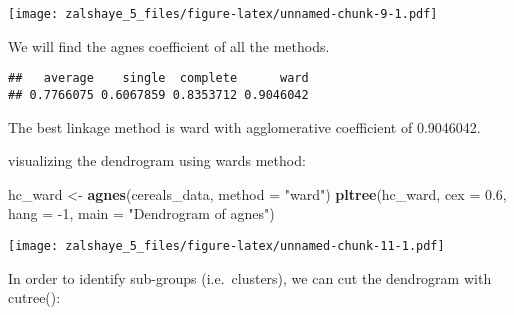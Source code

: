 \documentclass[
]{article}
\newenvironment{Shaded}{\begin{snugshade}}{\end{snugshade}}
\newcommand{\CommentTok}[1]{\textcolor[rgb]{0.56,0.35,0.01}{\textit{#1}}}
\newcommand{\ControlFlowTok}[1]{\textcolor[rgb]{0.13,0.29,0.53}{\textbf{#1}}}
\newcommand{\DataTypeTok}[1]{\textcolor[rgb]{0.13,0.29,0.53}{#1}}
\newcommand{\DecValTok}[1]{\textcolor[rgb]{0.00,0.00,0.81}{#1}}
\newcommand{\FloatTok}[1]{\textcolor[rgb]{0.00,0.00,0.81}{#1}}
\newcommand{\KeywordTok}[1]{\textcolor[rgb]{0.13,0.29,0.53}{\textbf{#1}}}
\newcommand{\NormalTok}[1]{#1}
\newcommand{\OperatorTok}[1]{\textcolor[rgb]{0.81,0.36,0.00}{\textbf{#1}}}
\newcommand{\StringTok}[1]{\textcolor[rgb]{0.31,0.60,0.02}{#1}}
\begin{document}
\texttt{[image: zalshaye\_5\_files/figure-latex/unnamed-chunk-9-1.pdf]}

We will find the agnes coefficient of all the methods.

\begin{Shaded}
\end{Shaded}

\begin{verbatim}
##   average    single  complete      ward 
## 0.7766075 0.6067859 0.8353712 0.9046042
\end{verbatim}

The best linkage method is ward with agglomerative coefficient of
0.9046042.

visualizing the dendrogram using wards method:

\begin{Shaded}
\begin{Highlighting}[]
\NormalTok{hc_ward <-}\StringTok{ }\KeywordTok{agnes}\NormalTok{(cereals_data, }\DataTypeTok{method =} \StringTok{"ward"}\NormalTok{)}
\KeywordTok{pltree}\NormalTok{(hc_ward, }\DataTypeTok{cex =} \FloatTok{0.6}\NormalTok{, }\DataTypeTok{hang =} \DecValTok{-1}\NormalTok{, }\DataTypeTok{main =} \StringTok{"Dendrogram of agnes"}\NormalTok{)}
\end{Highlighting}
\end{Shaded}

\texttt{[image: zalshaye\_5\_files/figure-latex/unnamed-chunk-11-1.pdf]}

In order to identify sub-groups (i.e.~clusters), we can cut the
dendrogram with cutree():
\end{document}
